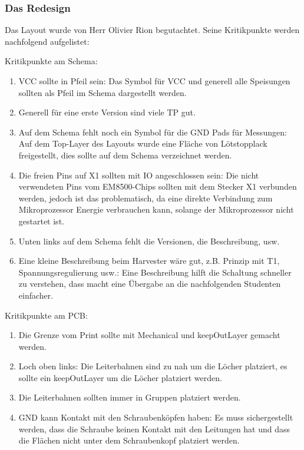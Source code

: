 \subsubsection{Das Redesign}

Das Layout wurde von Herr Olivier Rion begutachtet. Seine Kritikpunkte werden nachfolgend aufgelistet:

Kritikpunkte am Schema:
\begin{enumerate}
    \item VCC sollte in Pfeil sein: Das Symbol für VCC und generell alle Speisungen sollten als Pfeil im Schema dargestellt werden.
    \item Generell für eine erste Version sind viele TP gut.
    \item Auf dem Schema fehlt noch ein Symbol für die GND Pads für Messungen: Auf dem Top-Layer des Layouts wurde eine Fläche von Lötstopplack freigestellt, dies sollte auf dem Schema verzeichnet werden.
	\item Die freien Pins auf X1 sollten mit IO angeschlossen sein: Die nicht verwendeten Pins vom EM8500-Chips sollten mit dem Stecker X1 verbunden werden, jedoch ist das problematisch, da eine direkte Verbindung zum Mikroprozessor Energie verbrauchen kann, solange der Mikroprozessor nicht gestartet ist.
	\item Unten links auf dem Schema fehlt die Versionen, die Beschreibung, usw.
	\item Eine kleine Beschreibung beim Harvester wäre gut, z.B. Prinzip mit T1, Spannungsregulierung usw.: Eine Beschreibung hilft die Schaltung schneller zu verstehen, dass macht eine Übergabe an die nachfolgenden Studenten einfacher.
\end{enumerate}

Kritikpunkte am PCB:
\begin{enumerate}
    \item Die Grenze vom Print sollte mit Mechanical und keepOutLayer gemacht werden.
    \item Loch oben links: Die Leiterbahnen sind zu nah um die Löcher platziert, es sollte ein keepOutLayer um die Löcher platziert werden.
    \item Die Leiterbahnen sollten immer in Gruppen platziert werden.
	\item GND kann Kontakt mit den Schraubenköpfen haben: Es muss sichergestellt werden, dass die Schraube keinen Kontakt mit den Leitungen hat und dass die Flächen nicht unter dem Schraubenkopf platziert werden. 
\end{enumerate}

